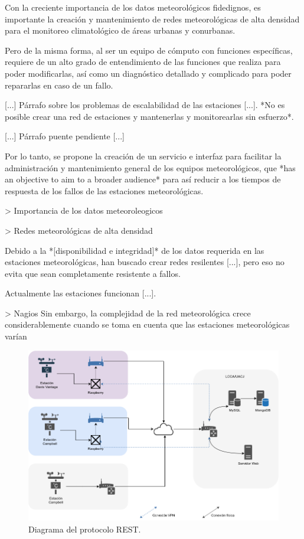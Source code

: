 \cite{rpi_weataher_station}

Con la creciente importancia de los datos meteorológicos fidedignos, es importante la creación y mantenimiento de redes meteorológicas de alta densidad para el monitoreo climatológico de áreas urbanas y conurbanas.


Pero de la misma forma, al ser un equipo de cómputo con funciones específicas, requiere de un alto grado de entendimiento de las funciones que realiza para poder modificarlas, así como un diagnóstico detallado y complicado para poder repararlas en caso de un fallo.

[...] Párrafo sobre los problemas de escalabilidad de las estaciones [...]. *No es posible crear una red de estaciones y mantenerlas y monitorearlas sin esfuerzo*.

[...] Párrafo puente pendiente [...]

Por lo tanto, se propone la creación de un servicio e interfaz para facilitar la administración y mantenimiento general de los equipos meteorológicos, que *has an objective to aim to a broader audience* para así reducir a los tiempos de respuesta de los fallos de las estaciones meteorológicas.

> Importancia de los datos meteoroleogicos

> Redes meteorológicas de alta densidad



Debido a la *[disponibilidad e integridad]* de los datos requerida en las estaciones meteorológicas, han buscado crear redes resilentes [...], pero eso no evita que sean completamente resistente a fallos.

Actualmente las estaciones funcionan [...].

> Nagios
Sin embargo, la complejidad de la red meteorológica crece considerablemente cuando se toma en cuenta que las estaciones meteorológicas varían

\begin{figure}[!ht]
	\centering
	\includegraphics[width=.80\linewidth]{images/diagrams/current_network.png}
	\caption{Diagrama del protocolo REST.}
	\label{fig:current_network}
\end{figure}

